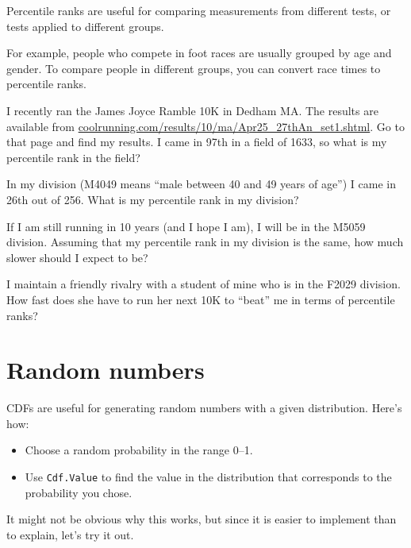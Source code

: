 \documentclass[12pt]{book}
\begin{document}
Percentile ranks are useful for comparing measurements from
different tests, or tests applied to different groups.

For example, people who compete in foot races are usually grouped by
age and gender.  To compare people in different groups, you can convert
race times to percentile ranks.

\begin{exercise}
I recently ran the James Joyce Ramble 10K
in Dedham MA.  The results are available from
\url{coolrunning.com/results/10/ma/Apr25_27thAn_set1.shtml}.
Go to that page and find my results.  I came in 97th in a field
of 1633, so what is my percentile rank in the field?

In my division (M4049 means ``male between 40 and 49 years of age'')
I came in 26th out of 256.  What is my percentile rank in my division?

If I am still running in 10 years (and I hope I am), I will be in
the M5059 division.  Assuming that my percentile rank in my division
is the same, how much slower should I expect to be?

I maintain a friendly rivalry with a student of mine who is in the
F2029 division.  How fast does she have to run her next 10K to
``beat'' me in terms of percentile ranks?

\end{exercise}


\section{Random numbers}
\label{random}

CDFs are useful for generating random numbers with a given
distribution.  Here's how:

\begin{itemize}

\item Choose a random probability in the range 0--1.

\item Use {\tt Cdf.Value} to find the value in the distribution
that corresponds to the probability you chose.

\end{itemize}

It might not be obvious why this works, but since it is easier
to implement than to explain, let's try it out.
\end{document}
